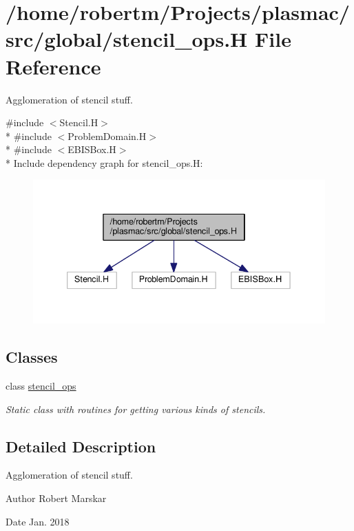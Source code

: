 \hypertarget{stencil__ops_8H}{}\section{/home/robertm/\+Projects/plasmac/src/global/stencil\+\_\+ops.H File Reference}
\label{stencil__ops_8H}


Agglomeration of stencil stuff.  


{\ttfamily \#include $<$Stencil.\+H$>$}\\*
{\ttfamily \#include $<$Problem\+Domain.\+H$>$}\\*
{\ttfamily \#include $<$E\+B\+I\+S\+Box.\+H$>$}\\*
Include dependency graph for stencil\+\_\+ops.\+H\+:\nopagebreak
\begin{figure}[H]
\begin{center}
\leavevmode
\includegraphics[width=339pt]{stencil__ops_8H__incl}
\end{center}
\end{figure}
\subsection*{Classes}
\begin{DoxyCompactItemize}
\item 
class \hyperlink{classstencil__ops}{stencil\+\_\+ops}
\begin{DoxyCompactList}\small\item\em Static class with routines for getting various kinds of stencils. \end{DoxyCompactList}\end{DoxyCompactItemize}


\subsection{Detailed Description}
Agglomeration of stencil stuff. 

\begin{DoxyAuthor}{Author}
Robert Marskar 
\end{DoxyAuthor}
\begin{DoxyDate}{Date}
Jan. 2018 
\end{DoxyDate}
